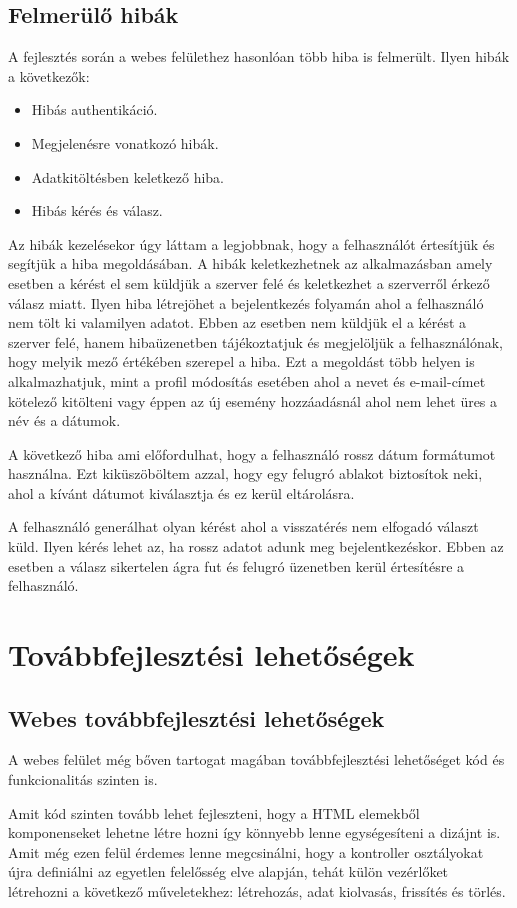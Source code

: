 \documentclass[
]{thesis-ekf}
\theoremstyle{definition}
\theoremstyle{remark}
\begin{document}
	\section{Felmerülő hibák}
	A fejlesztés során a webes felülethez hasonlóan több hiba is felmerült. Ilyen hibák a következők:
	\begin{itemize}
		\item Hibás authentikáció.
		\item Megjelenésre vonatkozó hibák.
		\item Adatkitöltésben keletkező hiba.
		\item Hibás kérés és válasz.
	\end{itemize}
	Az hibák kezelésekor úgy láttam a legjobbnak, hogy a felhasználót értesítjük és segítjük a hiba megoldásában. A hibák keletkezhetnek az alkalmazásban amely esetben a kérést el sem küldjük a szerver felé és keletkezhet a szerverről érkező válasz miatt. Ilyen hiba létrejöhet a bejelentkezés folyamán ahol a felhasználó nem tölt ki valamilyen adatot. Ebben az esetben nem küldjük el a kérést a szerver felé, hanem hibaüzenetben tájékoztatjuk és megjelöljük a felhasználónak, hogy melyik mező értékében szerepel a hiba. Ezt a megoldást több helyen is alkalmazhatjuk, mint a profil módosítás esetében ahol a nevet és e-mail-címet kötelező kitölteni vagy éppen az új esemény hozzáadásnál ahol nem lehet üres a név és a dátumok. 
	
	A következő hiba ami előfordulhat, hogy a felhasználó rossz dátum formátumot használna. Ezt kiküszöböltem azzal, hogy egy felugró ablakot biztosítok neki, ahol a kívánt dátumot kiválasztja és ez kerül eltárolásra. 
	
	A felhasználó generálhat olyan kérést ahol a visszatérés nem elfogadó választ küld. Ilyen kérés lehet az, ha rossz adatot adunk meg bejelentkezéskor. Ebben az esetben a válasz sikertelen ágra fut és felugró üzenetben kerül értesítésre a felhasználó. 
	
	\chapter{Továbbfejlesztési lehetőségek}
	\section{Webes továbbfejlesztési lehetőségek}
	A webes felület még bőven tartogat magában továbbfejlesztési lehetőséget kód és funkcionalitás szinten is. 
	
	Amit kód szinten tovább lehet fejleszteni, hogy a HTML elemekből komponenseket lehetne létre hozni így könnyebb lenne egységesíteni a dizájnt is. Amit még ezen felül érdemes lenne megcsinálni, hogy a kontroller osztályokat újra definiálni az egyetlen felelősség elve alapján, tehát külön vezérlőket létrehozni a következő műveletekhez: létrehozás, adat kiolvasás, frissítés és törlés. 
	
\end{document}
